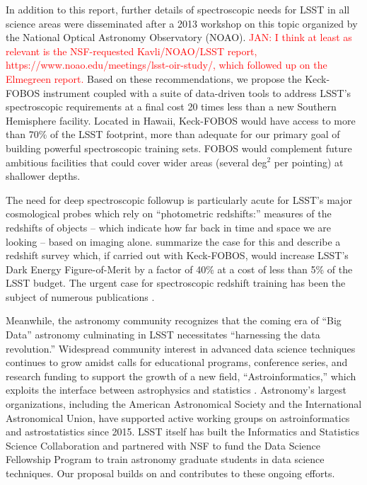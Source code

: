 \documentclass[oneside,11pt]{amsart}
\begin{document}
In addition to this report, further details of spectroscopic needs for LSST in all science areas were disseminated
after a 2013 workshop on this topic organized by the National Optical
Astronomy Observatory (NOAO).  \textcolor{red}{JAN: I think at least as relevant is the NSF-requested Kavli/NOAO/LSST report, https://www.noao.edu/meetings/lsst-oir-study/, which followed up on the Elmegreen report.}
 Based on these recommendations, we propose the Keck-FOBOS instrument coupled
with a suite of data-driven tools to address LSST's spectroscopic requirements at a final cost 20 times less than a new Southern Hemisphere facility. Located in Hawaii, Keck-FOBOS would have access to more than 70\% of the LSST
footprint, more than adequate for our primary goal of building powerful spectroscopic training sets.  FOBOS would complement future ambitious facilities that could cover wider areas (several deg$^2$ per pointing) at shallower depths.

The need for deep spectroscopic followup is particularly acute for LSST's major cosmological probes which rely on ``photometric redshifts:'' measures of the redshifts of objects -- which indicate how far back in time and space we are looking -- based on imaging alone.  \citet{newman15} summarize the case for this and describe a redshift survey which, if carried out with Keck-FOBOS, would increase LSST's Dark Energy Figure-of-Merit by a factor of 40\% at a cost of less than 5\% of the LSST budget.  The urgent case for spectroscopic redshift training has been the subject of numerous publications \citep[e.g.,][]{laureijs11,masters15, hemmati18}.  

Meanwhile, the astronomy community recognizes that the coming era of ``Big Data'' astronomy culminating in LSST
necessitates ``harnessing the data revolution.''  Widespread community interest in advanced data science techniques
continues to grow amidst calls for educational programs, conference series, and research funding to support the
growth of a new field, ``Astroinformatics,'' which exploits the interface between astrophysics and statistics
\citep{borne09}.  Astronomy's largest organizations, including the American Astronomical Society and the International
Astronomical Union, have supported active working groups on astroinformatics and astrostatistics since 2015.  LSST
itself has built the Informatics and Statistics Science Collaboration and partnered with NSF to fund the Data Science
Fellowship Program to train astronomy graduate students in data science techniques.  Our proposal builds on and
contributes to these ongoing efforts.
\end{document}
